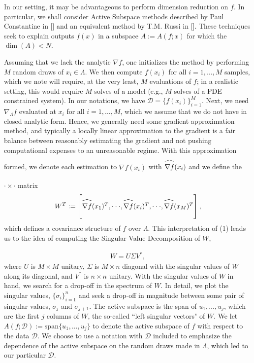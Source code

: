 \documentclass{amsart}
\newcommand\reallywidehat[1]{\arraycolsep=0pt\relax%
\begin{array}{c}
\stretchto{
  \scaleto{
    \scalerel*[\widthof{\ensuremath{#1}}]{\kern-.5pt\bigwedge\kern-.5pt}
    {\rule[-\textheight/2]{1ex}{\textheight}} %
  }{\textheight} %
}{0.5ex}\\           %
#1\\                 %
\rule{-1ex}{0ex}
\end{array}
}
\begin{document}
In our setting, it may be advantageous to perform dimension reduction on $f$. In particular, we shall consider Active Subspace methods described by Paul Constantine in [] and an equivalent method by T.M. Russi in []. These techniques seek to explain outputs $f(x)$ in a subspace $A:=A(f;x)$ for which the $\dim (A) <N$. 

Assuming that we lack the analytic $\nabla f$, one initializes the method by performing $M$ random draws of $x_i \in \Lambda$. We then compute $f(x_i)$ for all $i=1,\ldots,M$ samples, which we note will require, at the very least, $M$ evaluations of $f$; in a realistic setting, this would require $M$ solves of a model (e.g., $M$ solves of a PDE constrained system). In our notations, we have $\mathcal{D}=\{f(x_i)\}_{i=1}^M$. Next, we need $\nabla_\Lambda f$ evaluated at $x_i$ for all $i=1,\ldots,M$, which we assume that we do not have in closed analytic form. Hence, we generally need some gradient approximation method, and typically a locally linear approximation to the gradient is a fair balance between reasonably estimating the gradient and not pushing computational expenses to an unreasonable regime. With this approximation formed, we denote each estimation to $\nabla f(x_i)$ with $\reallywidehat{\nabla f}(x_i)$ and we define the $\cdot \times \cdot$ matrix
\begin{eqnarray}
W^T:=\begin{bmatrix}
\reallywidehat{\nabla f}(x_1)^T,
\cdot \cdot \cdot,
\reallywidehat{\nabla f}(x_i)^T,
\cdot \cdot \cdot ,
\reallywidehat{\nabla f}(x_M)^T\\
\end{bmatrix},
\end{eqnarray} which defines a covariance structure of $f$ over $\Lambda$. This interpretation of (1) leads us to the idea of computing the Singular Value Decomposition of $W$,

\begin{eqnarray}
W=U\Sigma V^*,
\end{eqnarray} where $U$ is $M \times M$ unitary, $\Sigma$ is $M \times n$ diagonal with the singular values of $W$ along its diagonal, and $V^*$ is $n \times n$ unitary. With the singular values of $W$ in hand, we search for a drop-off in the spectrum of $W$. In detail, we plot the singular values, $\{\sigma_i\}_{i=1}^n$ and seek a drop-off in magnitude between some pair of singular values, $\sigma_{j}$ and $\sigma_{j+1}$. The active subspace is the span of $u_1,\ldots,u_{j}$, which are the first $j$ columns of $W$, the so-called ``left singular vectors" of $W$. We let $A\left(f;\mathcal{D}\right):=\text{span}\{u_1,\ldots,u_{j}\}$ to denote the active subspace of $f$ with respect to the data $\mathcal{D}$. We choose to use a notation with $\mathcal{D}$ included to emphasize the dependence of the active subspace on the random draws made in $\Lambda$, which led to our particular $\mathcal{D}$.
\end{document}
